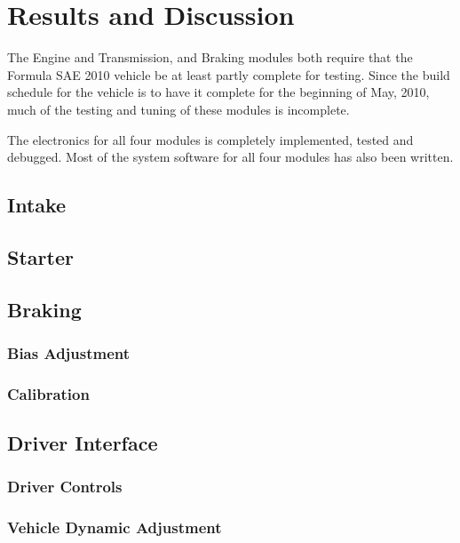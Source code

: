 \chapter{Results and Discussion}

The Engine and Transmission, and Braking modules both require that the Formula SAE 2010 vehicle be at least partly complete for testing. Since the build schedule for the vehicle is to have it complete for the beginning of May, 2010, much of the testing and tuning of these modules is incomplete.

The electronics for all four modules is completely implemented, tested and debugged. Most of the system software for all four modules has also been written.




\section{Intake}


\section{Starter}


\section{Braking}


\subsection{Bias Adjustment}


\subsection{Calibration}





\section{Driver Interface}


\subsection{Driver Controls}


\subsection{Vehicle Dynamic Adjustment}


